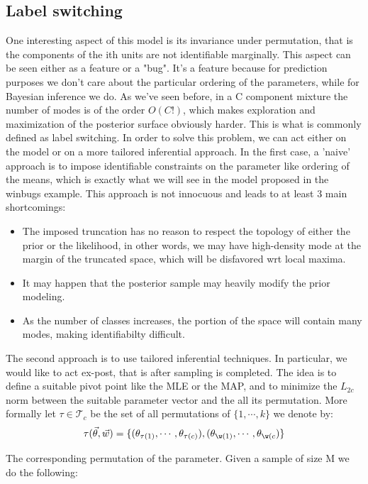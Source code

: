 \documentclass{article}
\begin{document}
\subsection{Label switching}
One interesting aspect of this model is its invariance under permutation, that is the components of the ith units are not identifiable marginally. This aspect can be seen either as a feature or a "bug". It's a feature because for prediction purposes we don't care about the particular ordering of the parameters, while for Bayesian inference we do. As we've seen before, in a C component mixture the number of modes is of the order $O(C!)$, which makes exploration and maximization of the posterior surface obviously harder. This is what is commonly defined as label switching.
In order to solve this problem, we can act either on the model or on a more tailored inferential approach. In the first case, a 'naive' approach is to impose identifiable constraints on the parameter like ordering of the means, which is exactly what we will see in the model proposed in the winbugs example. This approach is not innocuous and leads to at least 3 main shortcomings:
\begin{itemize}
\item  The imposed truncation has no reason to respect the topology of either the prior or the likelihood, in other words, we may have high-density mode at the margin of the truncated space, which will be disfavored wrt local maxima.
\item It may happen that the posterior sample may heavily modify the prior modeling. 
\item As the number of classes increases, the portion of the space will contain many modes, making identifiabilty difficult.
\end{itemize}
The second approach is to use tailored inferential techniques. In particular, we would like to act ex-post, that is after sampling is completed. The idea is to define a suitable pivot point like the MLE or the MAP, and to minimize the $L_{2c}$ norm between the suitable parameter vector and the all its permutation. More formally let $\tau \in \mathcal{T}_c$ be the set of all permutations of $\{1, \cdots, k\}$ we denote by:
\begin{equation}
\tau (\vec \theta, \vec w) = \{ (\theta_{\tau(1)},\cdots, \theta_{\tau(c)}),(\theta_{\w(1)},\cdots, \theta_{\w(c}) \}
\end{equation}

The corresponding permutation of the parameter. Given a sample of size M we do the following:
\end{document}
